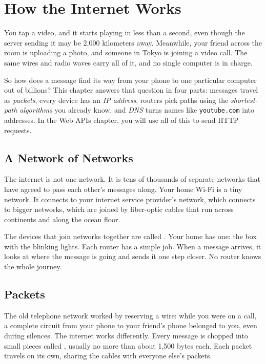 \chapter{How the Internet Works}

You tap a video, and it starts playing in less than a second, even though the server sending it may be
2,000 kilometers away. Meanwhile, your friend across the room is uploading a photo, and someone in
Tokyo is joining a video call. The same wires and radio waves carry all of it, and no single computer is
in charge.

So how does a message find its way from your phone to one particular computer out of billions? This
chapter answers that question in four parts: messages travel as \emph{packets}, every device has an
\emph{IP address}, routers pick paths using the \emph{shortest-path algorithms} you already know, and
\emph{DNS} turns names like \verb|youtube.com| into addresses. In the Web APIs chapter, you will
use all of this to send HTTP requests.

\section{A Network of Networks}
The internet is not one network. It is tens of thousands of separate networks that have agreed to pass
each other's messages along. Your home Wi-Fi is a tiny network. It connects to your internet service
provider's network, which connects to bigger networks, which are joined by fiber-optic cables that run
across continents and along the ocean floor.

The devices that join networks together are called . Your home has one: the
box with the blinking lights. Each router has a simple job. When a message arrives, it looks at where the
message is going and sends it one step closer. No router knows the whole journey.

\section{Packets}
The old telephone network worked by reserving a wire: while you were on a call, a complete circuit from
your phone to your friend's phone belonged to you, even during silences. The internet works differently.
Every message is chopped into small pieces called , usually no more than about 1,500
bytes each. Each packet travels on its own, sharing the cables with everyone else's packets.

